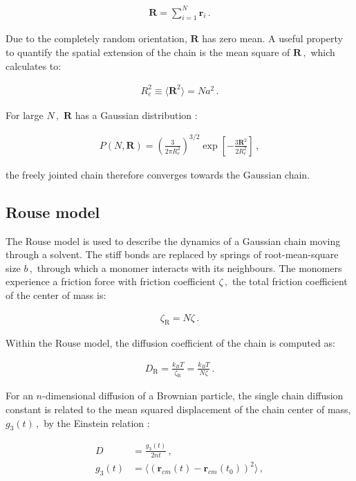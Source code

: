 \documentclass[bachelor,       %
               twoside,        %
               BCOR10mm,       %
               ngerman, english %
               ]{GAUBM}
\begin{document}
\begin{align}
    \mathbf R=\sum_{i=1}^{N}\mathbf r_i\,.
\end{align}

Due to the completely random orientation, $\mathbf R$ has zero mean. A useful property to quantify the spatial extension of the chain is the mean square of $\mathbf R\,,$ which calculates to:

\begin{align}
    R_e^2\equiv \langle\mathbf R^2\rangle=Na^2\,.
\end{align}

For large $N\,,$ $\mathbf R$ has a Gaussian distribution \cite{Rubin03}:
 
 
\begin{align}
    P(N,\mathbf R)=\left(\frac{3}{2\pi R_e^2}\right)^{3/2}\exp\left[-\frac{3\mathbf R^2}{2R_e^2}\right]\,,
\end{align}
 
 the freely jointed chain therefore converges towards the Gaussian chain. 
 
\subsection{Rouse model}

The Rouse model \cite{Rouse} is used to describe the dynamics of a Gaussian chain moving through a solvent. The stiff bonds are replaced by springs of root-mean-square size $b\,,$ through which a monomer interacts with its neighbours. The monomers experience a friction force with friction coefficient $\zeta\,,$ the total friction coefficient of the center of mass is:

\begin{align}
    \zeta_\mathrm R=N\zeta\,.
\end{align}

Within the Rouse model, the diffusion coefficient of the chain is computed as:

\begin{align}
    D_\mathrm R=\frac{k_BT}{\zeta_\mathrm R}=\frac{k_BT}{N\zeta}\,.
    \label{eq:d_rouse}
\end{align}

For an $n$-dimensional diffusion of a Brownian particle, the single chain diffusion constant is related to the mean squared displacement of the chain center of mass, $g_3(t)\,,$ by the Einstein relation \cite{einstein_1905}:

\begin{align}
    D&=\frac{g_3(t)}{2nt}\,,\\
    g_3(t)&=\langle (\mathbf r_{cm}(t)-\mathbf r_{cm}(t_0))^2\rangle\,,\nonumber
    \label{eq:einstein_relation}
\end{align}
\end{document}
